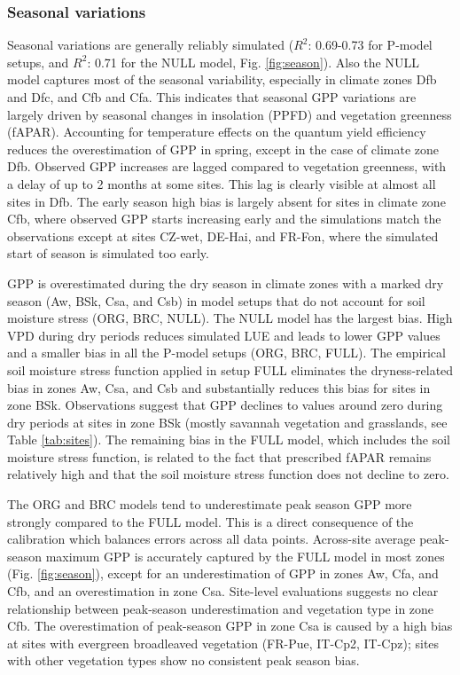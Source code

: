\documentclass[gmd, manuscript]{copernicus}
\newcommand{\rsq}{$R^2$}
\begin{document}
\subsubsection{Seasonal variations}
\label{sec:results_seasonal}

Seasonal variations are generally reliably simulated (\rsq : 0.69-0.73 for P-model setups, and \rsq : 0.71 for the NULL model, Fig. \ref{fig:season}). Also the NULL model captures most of the seasonal variability, especially in climate zones Dfb and Dfc, and Cfb and Cfa. This indicates that seasonal GPP variations are largely driven by seasonal changes in insolation (PPFD) and vegetation greenness (fAPAR). Accounting for temperature effects on the quantum yield efficiency reduces the overestimation of GPP in spring, except in the case of climate zone Dfb. Observed GPP increases are lagged compared to vegetation greenness, with a delay of up to 2 months at some sites. This lag is clearly visible at almost all sites in Dfb. The early season high bias is largely absent for sites in climate zone Cfb, where observed GPP starts increasing early and the simulations match the observations except at sites CZ-wet, DE-Hai, and FR-Fon, where the simulated start of season is simulated too early.

GPP is overestimated during the dry season in climate zones with a marked dry season (Aw, BSk, Csa, and Csb) in model setups that do not account for soil moisture stress (ORG, BRC, NULL). The NULL model has the largest bias. High VPD during dry periods reduces simulated LUE and leads to lower GPP values and a smaller bias in all the P-model setups (ORG, BRC, FULL). The empirical soil moisture stress function applied in setup FULL eliminates the dryness-related bias in zones Aw, Csa, and Csb and substantially reduces this bias for sites in zone BSk. Observations suggest that GPP declines to values around zero during dry periods at sites in zone BSk (mostly savannah vegetation and grasslands, see Table \ref{tab:sites}). The remaining bias in the FULL model, which includes the soil moisture stress function, is related to the fact that prescribed fAPAR remains relatively high and that the soil moisture stress function does not decline to zero.

The ORG and BRC models tend to underestimate peak season GPP more strongly compared to the FULL model. This is a direct consequence of the calibration which balances errors across all data points. Across-site average peak-season maximum GPP is accurately captured by the FULL model in most zones (Fig. \ref{fig:season}), except for an underestimation of GPP in zones Aw, Cfa, and Cfb, and an overestimation in zone Csa. Site-level evaluations suggests no clear relationship between peak-season underestimation and vegetation type in zone Cfb. The overestimation of peak-season GPP in zone Csa is caused by a high bias at sites with evergreen broadleaved vegetation (FR-Pue, IT-Cp2, IT-Cpz); sites with other vegetation types show no consistent peak season bias. 
\end{document}
